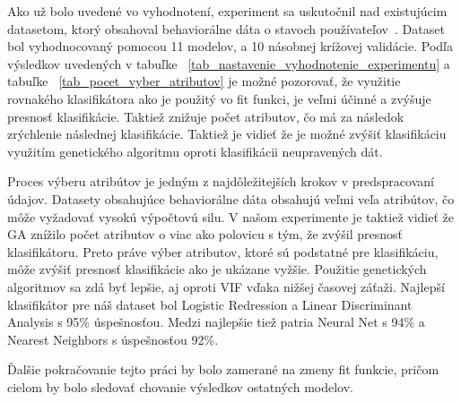 \documentclass[runningheads]{llncs}
\begin{document}
Ako už bolo uvedené vo vyhodnotení, experiment sa uskutočnil nad existujúcim datasetom, 
ktorý obsahoval behaviorálne dáta o stavoch používateľov~\cite{ref_dataset_anguita,ref_dataset}.
Dataset bol vyhodnocovaný pomocou 11 modelov, a 10 násobnej krížovej validácie.
Podľa výsledkov uvedených v tabuľke ~\ref{tab_nastavenie_vyhodnotenie_experimentu} 
a tabuľke ~\ref{tab_pocet_vyber_atributov} je možné pozorovať, že využitie rovnakého klasifikátora
ako je použitý vo fit funkci, je veľmi účinné a zvýšuje presnosť klasifikácie. Taktiež znižuje počet atributov,
čo má za následok zrýchlenie následnej klasifikácie. Taktiež je vidieť že je možné zvýšiť klasifikáciu
využitím genetického algoritmu oproti klasifikácii neupravených dát. 

Proces výberu atribútov je jedným z najdôležitejších krokov v predspracovaní údajov. Datasety 
obsahujúce behaviorálne dáta obsahujú veľmi veľa atribútov, čo môže vyžadovať vysokú výpočtovú silu. V našom
experimente je taktiež vidieť že GA znížilo počet atributov o viac ako polovicu s tým, že zvýšil presnosť klasifikátoru.
Preto práve výber atributov, ktoré sú podstatné pre klasifikáciu, môže zvýšiť presnosť klasifikácie
ako je ukázane vyžšie. Použitie genetických algoritmov sa zdá byť lepšie, aj oproti VIF vďaka nižšej časovej záťaži.
Najlepší klasifikátor pre náš dataset bol Logistic Redression a Linear Discriminant Analysis s 95\% úspešnosťou. Medzi najlepšie tiež patria
Neural Net s 94\% a Nearest Neighbors s úspešnosťou 92\%.

Ďalšie pokračovanie tejto práci by bolo zamerané na zmeny fit funkcie, pričom cielom by bolo sledovať chovanie výsledkov ostatných modelov.
\end{document}
